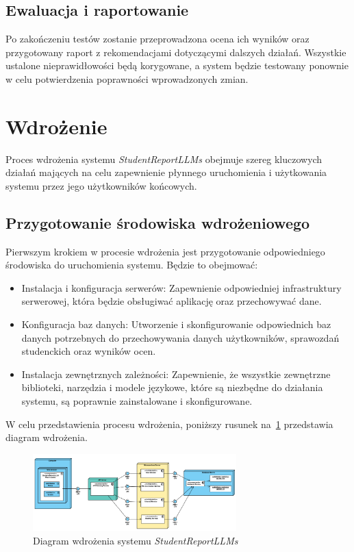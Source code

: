\documentclass[a4paper, 12pt]{article}
\begin{document}
\subsection{Ewaluacja i raportowanie}

Po zakończeniu testów zostanie przeprowadzona ocena ich wyników oraz przygotowany raport z rekomendacjami dotyczącymi dalszych działań. Wszystkie ustalone nieprawidłowości będą korygowane, a system będzie testowany ponownie w celu potwierdzenia poprawności wprowadzonych zmian.

\newpage
\section{Wdrożenie}
Proces wdrożenia systemu \textit{StudentReportLLMs} obejmuje szereg kluczowych działań mających na celu zapewnienie płynnego uruchomienia i użytkowania systemu przez jego użytkowników końcowych.

\subsection{Przygotowanie środowiska wdrożeniowego}

Pierwszym krokiem w procesie wdrożenia jest przygotowanie odpowiedniego środowiska do uruchomienia systemu. Będzie to obejmować:

\begin{itemize}
    \item Instalacja i konfiguracja serwerów: Zapewnienie odpowiedniej infrastruktury serwerowej, która będzie obsługiwać aplikację oraz przechowywać dane.
    \item Konfiguracja baz danych: Utworzenie i skonfigurowanie odpowiednich baz danych potrzebnych do przechowywania danych użytkowników, sprawozdań studenckich oraz wyników ocen.
    \item Instalacja zewnętrznych zależności: Zapewnienie, że wszystkie zewnętrzne biblioteki, narzędzia i modele językowe, które są niezbędne do działania systemu, są poprawnie zainstalowane i skonfigurowane.
\end{itemize}

W celu przedstawienia procesu wdrożenia, poniższy rusunek na~\ref{fig:wdrozenie} przedstawia diagram wdrożenia.

\begin{figure}[H]
    \centering
    \includegraphics[width=0.7\textwidth]{img/diagram_wdrozenia}
    \caption{Diagram wdrożenia systemu \textit{StudentReportLLMs}}
    \label{fig:wdrozenie}
\end{figure}
\end{document}
